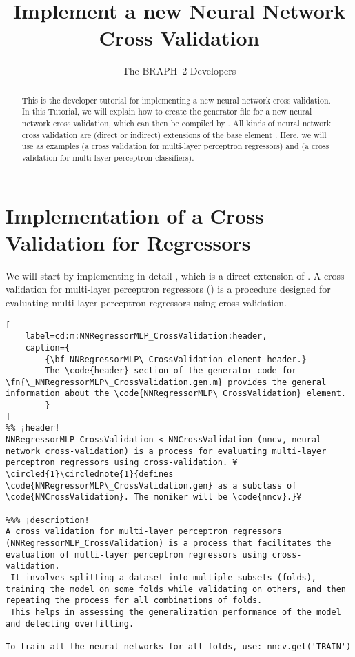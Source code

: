 \documentclass{tufte-handout}
\title{Implement a new Neural Network Cross Validation}
\author[The BRAPH~2 Developers]{The BRAPH~2 Developers}
\begin{document}
\maketitle

\begin{abstract}
\noindent
This is the developer tutorial for implementing a new neural network cross validation. 
In this Tutorial, we will explain how to create the generator file  for a new neural network cross validation, which can then be compiled by . All kinds of neural network cross validation are (direct or indirect) extensions of the base element . Here, we will use as examples  (a cross validation for multi-layer perceptron regressors) and  (a cross validation for multi-layer perceptron classifiers).
\end{abstract}

\tableofcontents

\clearpage
\section{Implementation of a Cross Validation for Regressors}

We will start by implementing in detail , which is a direct extension of .
A cross validation for multi-layer perceptron regressors () is a procedure designed for evaluating multi-layer perceptron regressors using cross-validation. 

\begin{lstlisting}[
	label=cd:m:NNRegressorMLP_CrossValidation:header,
	caption={
		{\bf NNRegressorMLP\_CrossValidation element header.}
		The \code{header} section of the generator code for \fn{\_NNRegressorMLP\_CrossValidation.gen.m} provides the general information about the \code{NNRegressorMLP\_CrossValidation} element.
		}
]
%% ¡header!
NNRegressorMLP_CrossValidation < NNCrossValidation (nncv, neural network cross-validation) is a process for evaluating multi-layer perceptron regressors using cross-validation. ¥\circled{1}\circlednote{1}{defines \code{NNRegressorMLP\_CrossValidation.gen} as a subclass of \code{NNCrossValidation}. The moniker will be \code{nncv}.}¥

%%% ¡description!
A cross validation for multi-layer perceptron regressors (NNRegressorMLP_CrossValidation) is a process that facilitates the evaluation of multi-layer perceptron regressors using cross-validation. 
 It involves splitting a dataset into multiple subsets (folds), training the model on some folds while validating on others, and then repeating the process for all combinations of folds. 
 This helps in assessing the generalization performance of the model and detecting overfitting.

To train all the neural networks for all folds, use: nncv.get('TRAIN')

\end{lstlisting}
\end{document}
